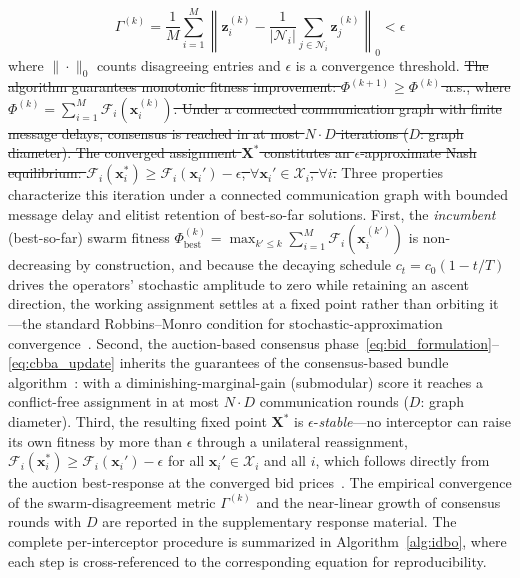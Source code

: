 \documentclass[lettersize,journal]{IEEEtran}
\newcommand{\hladd}[1]{{\color{blue}#1}}
\newcommand{\hldel}[1]{{\color{red}\sout{#1}}}
\begin{document}
\begin{equation}
\label{eq:convergence}
\Gamma^{(k)} = \frac{1}{M} \sum_{i=1}^{M} \left\| \mathbf{z}_i^{(k)} - \frac{1}{|\mathcal{N}_i|} \sum_{j \in \mathcal{N}_i} \mathbf{z}_j^{(k)} \right\|_0 < \epsilon
\end{equation}
where $\|\cdot\|_0$ counts disagreeing entries and $\epsilon$ is a convergence threshold. \hldel{The algorithm guarantees monotonic fitness improvement: $\Phi^{(k+1)} \geq \Phi^{(k)}$ a.s., where $\Phi^{(k)} = \sum_{i=1}^{M} \mathcal{F}_i(\mathbf{x}_i^{(k)})$. Under a connected communication graph with finite message delays, consensus is reached in at most $N \cdot D$ iterations ($D$: graph diameter). The converged assignment $\mathbf{X}^*$ constitutes an $\epsilon$-approximate Nash equilibrium: $\mathcal{F}_i(\mathbf{x}_i^*) \geq \mathcal{F}_i(\mathbf{x}_i') - \epsilon$, $\forall \mathbf{x}_i' \in \mathcal{X}_i$, $\forall i$.} \hladd{Three properties characterize this iteration under a connected communication graph with bounded message delay and elitist retention of best-so-far solutions. First, the \emph{incumbent} (best-so-far) swarm fitness $\Phi_{\mathrm{best}}^{(k)}=\max_{k'\le k}\sum_{i=1}^{M}\mathcal{F}_i(\mathbf{x}_i^{(k')})$ is non-decreasing by construction, and because the decaying schedule $c_t=c_0(1-t/T)$ drives the operators' stochastic amplitude to zero while retaining an ascent direction, the working assignment settles at a fixed point rather than orbiting it---the standard Robbins--Monro condition for stochastic-approximation convergence~\cite{robbins1951stochastic}. Second, the auction-based consensus phase~\eqref{eq:bid_formulation}--\eqref{eq:cbba_update} inherits the guarantees of the consensus-based bundle algorithm~\cite{choi2009consensus}: with a diminishing-marginal-gain (submodular) score it reaches a conflict-free assignment in at most $N\!\cdot\!D$ communication rounds ($D$: graph diameter). Third, the resulting fixed point $\mathbf{X}^\ast$ is $\epsilon$-\emph{stable}---no interceptor can raise its own fitness by more than $\epsilon$ through a unilateral reassignment, $\mathcal{F}_i(\mathbf{x}_i^\ast)\ge\mathcal{F}_i(\mathbf{x}_i')-\epsilon$ for all $\mathbf{x}_i'\in\mathcal{X}_i$ and all $i$, which follows directly from the auction best-response at the converged bid prices~\cite{choi2009consensus}. The empirical convergence of the swarm-disagreement metric $\Gamma^{(k)}$ and the near-linear growth of consensus rounds with $D$ are reported in the supplementary response material. The complete per-interceptor procedure is summarized in Algorithm~\ref{alg:idbo}, where each step is cross-referenced to the corresponding equation for reproducibility.}
\end{document}
